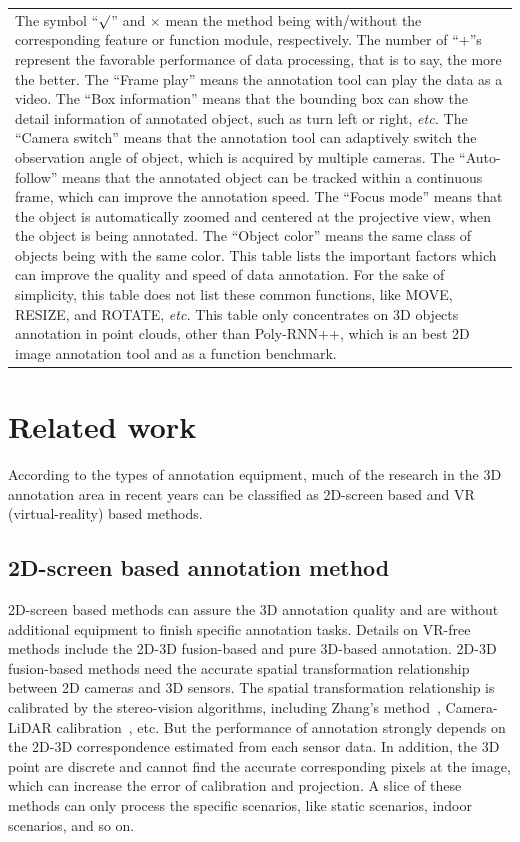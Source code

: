 \documentclass[letterpaper, 10 pt, conference]{ieeeconf}  %
\begin{document}
\begin{table}[]
\begin{tabular}{p{17cm}}
		The symbol ``$\surd$'' and $\times$ mean the method being with/without the corresponding feature or function module, respectively. The number of ``$\textbf{+}$''s represent the favorable performance of data processing, that is to say, the more the better. The ``Frame play'' means the annotation tool can play the data as a video. The ``Box information'' means that the bounding box can show the detail information of annotated object, such as turn left or right, \textit{etc.} The ``Camera switch''  means that the annotation tool can adaptively switch the observation angle of object, which is acquired by multiple cameras. The ``Auto-follow'' means that the annotated object can be tracked within a continuous frame, which can improve the annotation speed. The ``Focus mode''  means that the object is automatically zoomed and centered at the projective view, when the object is being annotated. The ``Object color''  means the same class of objects being with the same color. This table lists the important factors which can improve the quality and speed of data annotation. For the sake of simplicity, this table does not list these common functions, like MOVE, RESIZE, and ROTATE, \textit{etc.} This table only concentrates on 3D objects annotation in point clouds, other than Poly-RNN++, which is an best 2D image annotation tool and as a function benchmark.
	\end{tabular}
	\label{tab:expanda}
	\vspace{-0.5cm}
\end{table}


\section{Related work}
\label{Realtedwork}
According to the types of annotation equipment, much of the research in the 3D annotation area in recent years can be classified as 2D-screen based and VR (virtual-reality) based methods.
\subsection{2D-screen based annotation method}
2D-screen based methods can assure the 3D annotation quality  and are without additional equipment to finish specific annotation tasks.
Details on VR-free methods include the 2D-3D fusion-based and pure 3D-based annotation.
2D-3D fusion-based methods need the accurate spatial transformation relationship between 2D cameras and 3D sensors.
The spatial transformation relationship is calibrated by the stereo-vision algorithms, including Zhang's method~\cite{zhangzhegnyou}, Camera-LiDAR calibration~\cite{roadCalibration}, etc.
But the performance of annotation strongly depends on the 2D-3D correspondence estimated from each sensor data. In addition, the 3D point are discrete and cannot find the accurate corresponding pixels at the image, which can increase the error of calibration and projection. A slice of these methods can only process the specific scenarios, like static scenarios, indoor scenarios, and so on.
\end{document}
